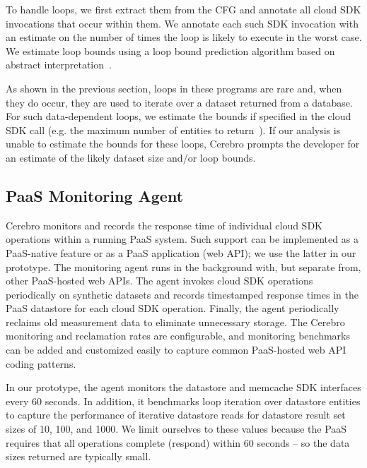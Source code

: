 To handle loops, we first extract them from the CFG and 
annotate all cloud SDK invocations that occur within them.
We annotate each such SDK invocation with an estimate on the number of times
the loop is likely to execute in the worst case. 
We estimate loop bounds using a loop bound prediction algorithm 
based on abstract interpretation~\cite{bygde2010static}. 

As shown in the previous section, loops in these programs 
are rare and, when they do occur, they are
used to iterate over a dataset returned from a database.
For such data-dependent loops, we estimate the bounds if specified 
in the cloud SDK call (e.g. the maximum number of 
entities to return~\cite{gae-fetch-options}).
If our analysis is unable to estimate the bounds for these loops, Cerebro prompts
the developer for an estimate of the likely dataset size and/or loop bounds.

\subsection{PaaS Monitoring Agent}
Cerebro monitors and records the response time of individual
cloud SDK operations within a running PaaS system.  Such support can be 
implemented as a PaaS-native feature or as
a PaaS application (web API); we use the latter in our prototype.
The monitoring agent runs in the background with, but separate from, 
other PaaS-hosted web APIs.
The agent invokes cloud SDK operations periodically on synthetic datasets and 
records timestamped response times in the PaaS datastore for each cloud SDK
operation.
Finally, the agent periodically reclaims old measurement data
to eliminate unnecessary storage. The Cerebro monitoring and reclamation 
rates are configurable, and monitoring benchmarks can be added and customized
easily to capture common PaaS-hosted web API coding patterns.

In our prototype, the agent monitors the datastore and memcache SDK interfaces
every 60 seconds. In addition, it 
benchmarks loop iteration over datastore entities to capture
the performance of iterative datastore reads for datastore result set sizes 
of 10, 100, and 1000. We limit ourselves to these values because the PaaS requires
that all operations complete (respond) within 60 seconds -- so the data
sizes returned are typically small.

